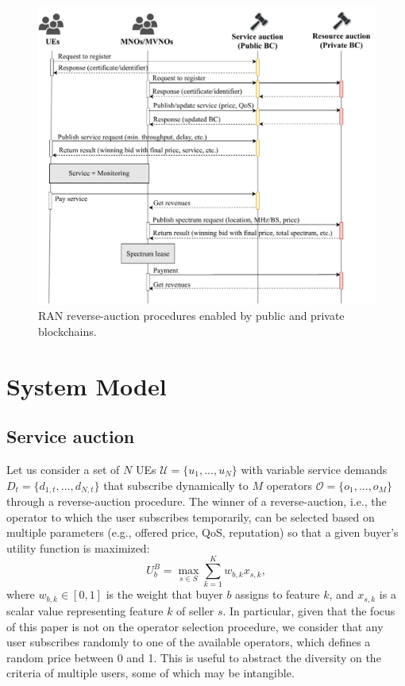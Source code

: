 \documentclass[conference]{IEEEtran}
\theoremstyle{definition}
\begin{document}
\begin{figure}[ht!]
\includegraphics[width=\linewidth]{ra_options.pdf}
\caption{RAN reverse-auction procedures enabled by public and private blockchains.}
\label{fig:ran_sharing_ecosystem}
\end{figure}

\section{System Model}
\label{section:system_model}
\subsection{Service auction}
Let us consider a set of $N$ UEs $\mathcal{U} = \{u_1,...,u_N\}$ with variable service demands $D_t = \{d_{1,t},...,d_{N,t}\}$ that subscribe dynamically to $M$ operators $\mathcal{O} = \{o_1,...,o_M\}$ through a reverse-auction procedure. The winner of a reverse-auction, i.e., the operator to which the user subscribes temporarily, can be selected based on multiple parameters (e.g., offered price, QoS, reputation) so that a given buyer's utility function is maximized:
\begin{equation}
    U^B_b = \max_{s \in S} \sum_{k=1}^K w_{b,k} x_{s,k},
    \label{eq:utility_buyer}
\end{equation}
where $w_{b,k} \in [0,1]$ is the weight that buyer $b$ assigns to feature $k$, and $x_{s,k}$ is a scalar value representing feature $k$ of seller $s$. In particular, given that the focus of this paper is not on the operator selection procedure, we consider that any user subscribes randomly to one of the available operators, which defines a random price between 0 and 1. This is useful to abstract the diversity on the criteria of multiple users, some of which may be intangible.
 
\end{document}
